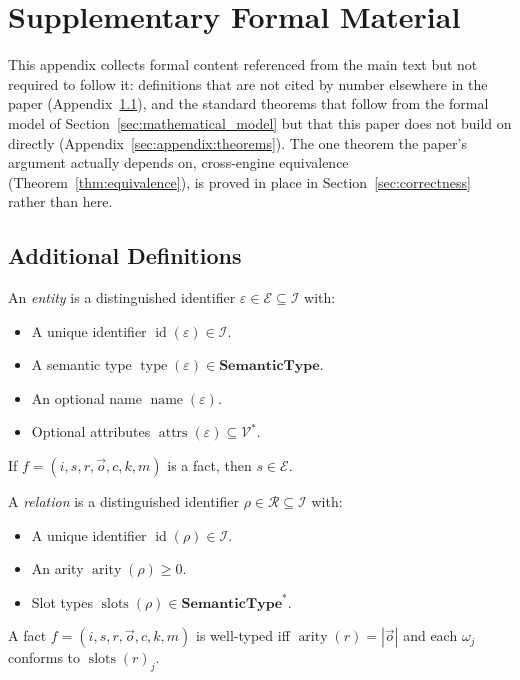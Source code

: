 \appendix
\section{Supplementary Formal Material}
\label{sec:appendix}

This appendix collects formal content referenced from the main text but
not required to follow it: definitions that are not cited by number
elsewhere in the paper (Appendix~\ref{sec:appendix:definitions}), and the
standard theorems that follow from the formal model of
Section~\ref{sec:mathematical_model} but that this paper does not build
on directly (Appendix~\ref{sec:appendix:theorems}). The one theorem the
paper's argument actually depends on, cross-engine equivalence
(Theorem~\ref{thm:equivalence}), is proved in place in
Section~\ref{sec:correctness} rather than here.

\subsection{Additional Definitions}
\label{sec:appendix:definitions}

\begin{definition}[Entity]
\label{def:entity}
An \emph{entity} is a distinguished identifier $\varepsilon \in \mathcal{E} \subseteq \mathcal{I}$
with:
\begin{itemize}
    \item A unique identifier $\operatorname{id}(\varepsilon) \in \mathcal{I}$.
    \item A semantic type $\operatorname{type}(\varepsilon) \in \mathbf{SemanticType}$.
    \item An optional name $\operatorname{name}(\varepsilon)$.
    \item Optional attributes $\operatorname{attrs}(\varepsilon) \subseteq \mathcal{V}^*$.
\end{itemize}
If $f = (i, s, r, \vec{o}, c, k, m)$ is a fact, then $s \in \mathcal{E}$.
\end{definition}

\begin{definition}[Relation]
\label{def:relation}
A \emph{relation} is a distinguished identifier $\rho \in \mathcal{R} \subseteq \mathcal{I}$
with:
\begin{itemize}
    \item A unique identifier $\operatorname{id}(\rho) \in \mathcal{I}$.
    \item An arity $\operatorname{arity}(\rho) \geq 0$.
    \item Slot types $\operatorname{slots}(\rho) \in \mathbf{SemanticType}^*$.
\end{itemize}
A fact $f = (i, s, r, \vec{o}, c, k, m)$ is well-typed iff
$\operatorname{arity}(r) = |\vec{o}|$ and each $\omega_j$ conforms to
$\operatorname{slots}(r)_j$.
\end{definition}

